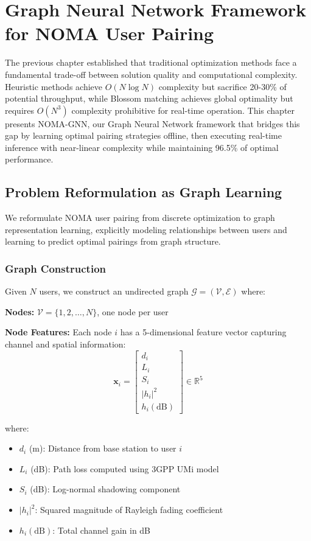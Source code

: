 \chapter{Graph Neural Network Framework for NOMA User Pairing}
\label{chap:gnn}

The previous chapter established that traditional optimization methods face a fundamental trade-off between solution quality and computational complexity. Heuristic methods achieve $O(N \log N)$ complexity but sacrifice 20-30\% of potential throughput, while Blossom matching achieves global optimality but requires $O(N^3)$ complexity prohibitive for real-time operation. This chapter presents NOMA-GNN, our Graph Neural Network framework that bridges this gap by learning optimal pairing strategies offline, then executing real-time inference with near-linear complexity while maintaining 96.5\% of optimal performance.

\section{Problem Reformulation as Graph Learning}

We reformulate NOMA user pairing from discrete optimization to graph representation learning, explicitly modeling relationships between users and learning to predict optimal pairings from graph structure.

\subsection{Graph Construction}

Given $N$ users, we construct an undirected graph $\mathcal{G} = (\mathcal{V}, \mathcal{E})$ where:

\textbf{Nodes:} $\mathcal{V} = \{1, 2, \ldots, N\}$, one node per user

\textbf{Node Features:} Each node $i$ has a 5-dimensional feature vector capturing channel and spatial information:
\begin{equation}
\mathbf{x}_i = \begin{bmatrix} 
d_i \\ L_i \\ S_i \\ |h_i|^2 \\ h_i(\text{dB})
\end{bmatrix} \in \mathbb{R}^5
\end{equation}

where:
\begin{itemize}
    \item $d_i$ (m): Distance from base station to user $i$
    \item $L_i$ (dB): Path loss computed using 3GPP UMi model
    \item $S_i$ (dB): Log-normal shadowing component
    \item $|h_i|^2$: Squared magnitude of Rayleigh fading coefficient
    \item $h_i(\text{dB})$: Total channel gain in dB
\end{itemize}

